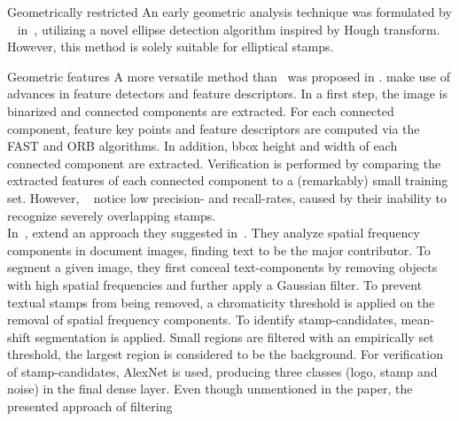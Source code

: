 \begin{description}
\begin{enumerate*}[label={\alph*)},font={\color{red!50!black}\bfseries}]
                \item [Geometrically restricted]
                    An early geometric analysis technique was formulated by
                    ~\citeauthor*{Zhu.2006} in~\cite{Zhu.2006}, utilizing a
                    novel ellipse detection algorithm inspired by Hough
                    transform. However, this method is solely suitable for
                    elliptical stamps.
        \end{enumerate*}
    \item [Generic approaches]
    \begin{enumerate*}[label={\alph*)},font={\color{red!50!black}\bfseries}]
        \item [Geometric features]
        A more versatile method than~\cite{Zhu.2006} was proposed in
        \cite{Ahmed.2013, Ahmed.2016}.
        \citeauthor*{Ahmed.2013} make use of advances in
        feature detectors and feature descriptors. In a first step, the
        image is binarized and connected components are extracted. For each
        connected component, feature key points and feature descriptors are
        computed via the FAST and ORB algorithms. In addition, \gls{bbox}
        height and width of each connected component are extracted.
        Verification is performed by comparing the extracted features of each
        connected component to a (remarkably) small training set. However,
        ~\citeauthor*{Ahmed.2013} notice low precision-
        and recall-rates, caused by their inability to recognize severely
        overlapping stamps.\\
        In~\cite{Nandedkar.2015b},
        \citeauthor*{Nandedkar.2015b} extend an approach they
        suggested in~\cite{Nandedkar.2015}. They analyze spatial
        frequency components in document images, finding text to be the major
        contributor. To segment a given image, they first conceal
        text-components by removing objects with high spatial frequencies and
        further apply a Gaussian filter. To prevent textual stamps from being
        removed, a chromaticity threshold is applied on the removal of spatial
        frequency components. To identify stamp-candidates, mean-shift
        segmentation is applied. Small regions are filtered with an empirically
        set threshold, the largest region is considered to be the background.
        For verification of stamp-candidates, AlexNet is used, producing three
        classes (logo, stamp and noise) in the final \gls{dense layer}. Even 
        though unmentioned in the paper, the presented approach of filtering 

\end{enumerate*}
\end{description}
